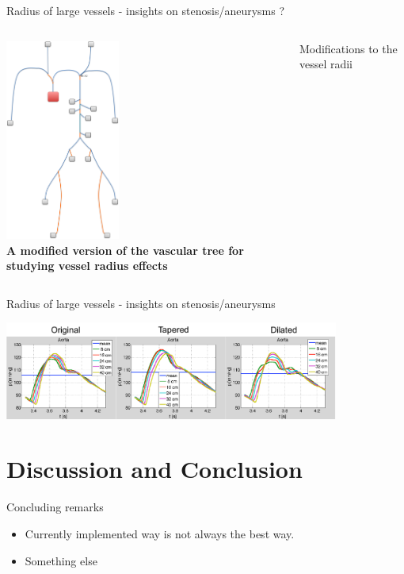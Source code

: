 \documentclass{beamer}
\begin{document}
\begin{frame}{Radius of large vessels - insights on stenosis/aneurysms ?}

	\begin{columns}
		\begin{column}[r]{5.5cm}
			\centering
			\includegraphics[width=3.75cm]{fulltree.png}\\
			\textbf{\footnotesize{A modified version of the vascular tree for studying vessel radius effects}}
		\end{column}
		\begin{column}[l]{5.5cm}
			\begin{block}{\footnotesize{Modifications to the vessel radii}}
		
			\end{block}
		\end{column}
	\end{columns}

\end{frame}

\begin{frame}{Radius of large vessels - insights on stenosis/aneurysms}

	\begin{center}
	\includegraphics[width=11.0cm]{aortawavereflections.pdf}
	\end{center}

\end{frame}

\section{Discussion and Conclusion}

\begin{frame}{Concluding remarks}
\begin{itemize}
	\item
	Currently implemented way is not always the best way.
	\item
	Something else
\end{itemize}
\end{frame}
\end{document}
